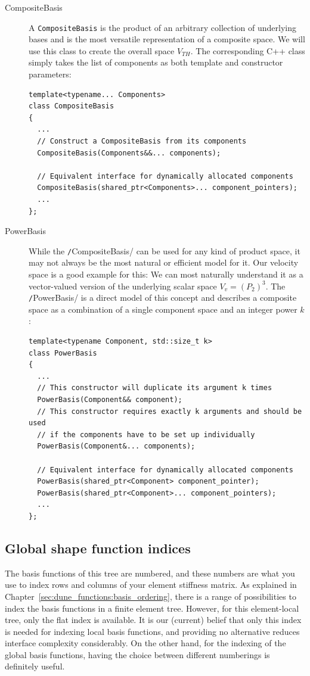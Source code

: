 \documentclass[a4paper,10pt,headings=normal,bibliography=totoc]{scrartcl}
\newcommand{\cpp}[1]{\lstinline[basicstyle=\ttfamily]!#1!}
\begin{document}
\begin{description}
\item[CompositeBasis] A \cpp{CompositeBasis} is the product of an arbitrary collection of underlying bases and is the
most versatile representation of a composite space. We will use this class to create the overall space $V_{TH}$.
The corresponding C++ class simply takes the list of components as both template and constructor parameters:
\begin{lstlisting}
template<typename... Components>
class CompositeBasis
{
  ...
  // Construct a CompositeBasis from its components
  CompositeBasis(Components&&... components);

  // Equivalent interface for dynamically allocated components
  CompositeBasis(shared_ptr<Components>... component_pointers);
  ...
};
\end{lstlisting}
\item[PowerBasis] While the \cpp/CompositeBasis/ can be used for any kind of product space, it may not always be the most natural
or efficient model for it. Our velocity space is a good example for this: We can most naturally understand it as a vector-valued
version of the underlying scalar space $V_v = (P_2)^3$. The \cpp/PowerBasis/ is a direct model of this concept and describes
a composite space as a combination of a single component space and an integer power $k$:
  \begin{lstlisting}
template<typename Component, std::size_t k>
class PowerBasis
{
  ...
  // This constructor will duplicate its argument k times
  PowerBasis(Component&& component);
  // This constructor requires exactly k arguments and should be used
  // if the components have to be set up individually
  PowerBasis(Component&... components);

  // Equivalent interface for dynamically allocated components
  PowerBasis(shared_ptr<Component> component_pointer);
  PowerBasis(shared_ptr<Component>... component_pointers);
  ...
};
  \end{lstlisting}
\end{description}


\subsection{Global shape function indices}

The basis functions of this tree are numbered, and these numbers are what you use to index rows and columns
of your element stiffness matrix.  As explained in Chapter~\ref{sec:dune_functions:basis_ordering}, there is a range
of possibilities to index the basis functions in a finite element tree.  However, for this element-local
tree, only the flat index is available.  It is our (current) belief that only this
index is needed for indexing local basis functions, and providing no alternative reduces interface
complexity considerably.  On the other hand, for the indexing of the global basis functions, having the choice
between different numberings is definitely useful.
\end{document}
